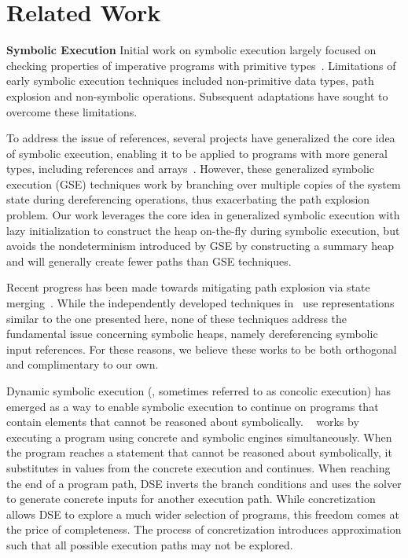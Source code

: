 \section{Related Work}

\noindent\textbf{Symbolic Execution} 
Initial work on symbolic execution largely focused on checking
properties of imperative programs with primitive
types~\cite{Clarke:76,King:76}. Limitations of early symbolic execution techniques included non-primitive data types, path explosion and non-symbolic operations. Subsequent adaptations have sought to overcome these limitations.

To address the issue of references, several projects have generalized
the core idea of symbolic execution, enabling it to be applied to
programs with more general types, including references and
arrays~\cite{GSE03,KiasanKunit,Cadar:2008,Rosner:2015}. However, these generalized symbolic execution (GSE) techniques work by branching over multiple copies of the system state during dereferencing operations, thus exacerbating the path explosion problem. Our work leverages the core idea in generalized symbolic execution
with lazy initialization to construct the heap on-the-fly during
symbolic execution, but avoids the nondeterminism introduced by GSE by
constructing a summary heap and will generally create fewer paths than
GSE techniques.

Recent progress has been made towards mitigating path explosion via state merging~\cite{Kuznetsov:2012,Sen:2014,Torlak:2014}. While the independently developed techniques in~\cite{Sen:2014,Torlak:2014} use representations similar to the one presented here, none of these techniques address the fundamental issue concerning symbolic heaps, namely dereferencing symbolic input references. For these reasons, we believe these works to be both orthogonal and complimentary to our own.

Dynamic symbolic execution (\dsetxt{}, sometimes referred to as concolic execution) has emerged as a way to enable symbolic execution to continue on programs that contain elements that cannot be reasoned about symbolically. ~\dsetxt{} works by executing a program using concrete and symbolic engines simultaneously. When the program reaches a statement that cannot be reasoned about symbolically, it substitutes in values from the concrete execution and continues. When reaching the end of a program path, DSE inverts the branch conditions and uses the solver to generate concrete inputs for another execution path. While concretization allows DSE to explore a much wider selection of programs, this freedom comes at the price of completeness. The process of concretization introduces approximation such that all possible execution paths may not be explored.

